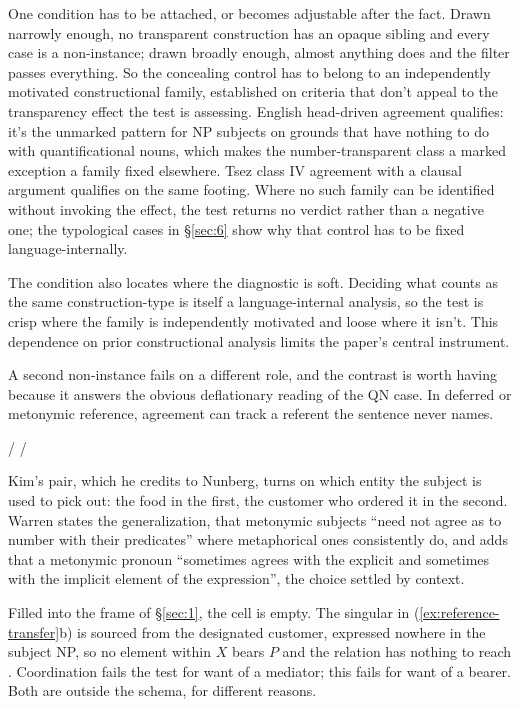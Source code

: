One condition has to be attached, or  becomes adjustable after the fact. Drawn narrowly enough, no transparent construction has an opaque sibling and every case is a non-instance; drawn broadly enough, almost anything does and the filter passes everything. So the concealing control has to belong to an independently motivated constructional family, established on criteria that don't appeal to the transparency effect the test is assessing. English head-driven agreement qualifies: it's the unmarked pattern for NP subjects on grounds that have nothing to do with quantificational nouns, which makes the number-transparent class a marked exception  a family fixed elsewhere. Tsez class IV agreement with a clausal argument qualifies on the same footing. Where no such family can be identified without invoking the effect, the test returns no verdict rather than a negative one; the typological cases in §\ref{sec:6} show why that control has to be fixed language-internally.

The condition also locates where the diagnostic is soft. Deciding what counts as the same construction-type is itself a language-internal analysis, so the test is crisp where the family is independently motivated and loose where it isn't. This dependence on prior constructional analysis limits the paper's central instrument.

A second non-instance fails on a different role, and the contrast is worth having because it answers the obvious deflationary reading of the QN case. In deferred or metonymic reference, agreement can track a referent the sentence never names.

\ea\label{ex:reference-transfer}
\ea {}/ 
\ex {}/ 
\z
\z

Kim's \autocite*[1108]{kim-2004-hybrid-agreement} pair, which he credits to Nunberg, turns on which entity the subject is used to pick out: the food in the first, the customer who ordered it in the second. Warren \autocite*[16]{warren2006} states the generalization, that metonymic subjects \enquote{need not agree as to number with their predicates} where metaphorical ones consistently do, and adds that a metonymic pronoun \enquote{sometimes agrees with the explicit and sometimes with the implicit element of the expression}, the choice settled by context.

Filled into the frame of §\ref{sec:1}, the  cell is empty. The singular in (\ref{ex:reference-transfer}b) is sourced from the designated customer, expressed nowhere in the subject NP, so no element within $X$ bears $P$ and the relation has nothing to reach . Coordination fails the test for want of a mediator; this fails for want of a bearer. Both are outside the schema, for different reasons.

